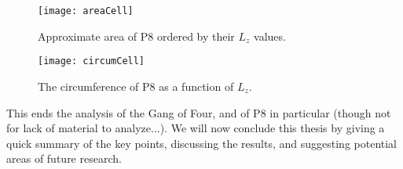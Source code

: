 \begin{figure}[h!]
\texttt{[image: areaCell]}
\caption{Approximate area of P8 ordered by their $L_z$ values.}\label{fig:areaCell}
\end{figure}

\begin{figure}[h!]
\texttt{[image: circumCell]}
\caption{The circumference of P8 as a function of $L_z$.}\label{fig:circumCell}
\end{figure}

\clearpage 
This ends the analysis of the Gang of Four, and of P8 in particular (though not for lack of material to analyze...). We will now conclude this thesis by giving a quick summary of the key points, discussing the results, and suggesting potential areas of future research. 